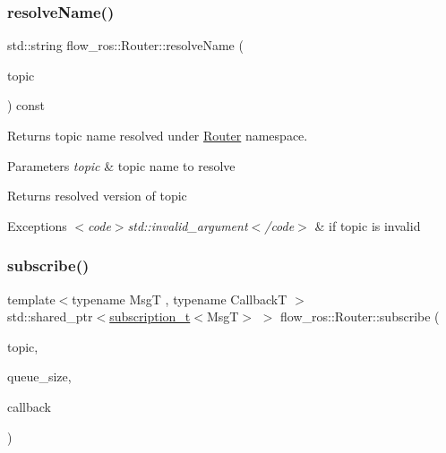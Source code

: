 \subsubsection{\texorpdfstring{resolve\+Name()}{resolveName()}}
{\footnotesize\ttfamily std\+::string flow\+\_\+ros\+::\+Router\+::resolve\+Name (\begin{DoxyParamCaption}\item[{const std\+::string \&}]{topic }\end{DoxyParamCaption}) const}



Returns topic name resolved under \hyperlink{classflow__ros_1_1_router}{Router} namespace. 


\begin{DoxyParams}{Parameters}
{\em topic} & topic name to resolve\\
\hline
\end{DoxyParams}
\begin{DoxyReturn}{Returns}
resolved version of {\ttfamily topic} 
\end{DoxyReturn}

\begin{DoxyExceptions}{Exceptions}
{\em $<$code$>$std\+::invalid\+\_\+argument$<$/code$>$} & if {\ttfamily topic} is invalid \\
\hline
\end{DoxyExceptions}
\mbox{\label{classflow__ros_1_1_router_a6f8d999bfe280549f4a3216205007450}} 
\subsubsection{\texorpdfstring{subscribe()}{subscribe()}\hspace{0.1cm}{\footnotesize\ttfamily [1/2]}}
{\footnotesize\ttfamily template$<$typename MsgT , typename CallbackT $>$ \\
std\+::shared\+\_\+ptr$<$\hyperlink{classflow__ros_1_1routing_1_1_local_subscription}{subscription\+\_\+t}$<$MsgT$>$ $>$ flow\+\_\+ros\+::\+Router\+::subscribe (\begin{DoxyParamCaption}\item[{const std\+::string \&}]{topic,  }\item[{const std\+::uint32\+\_\+t}]{queue\+\_\+size,  }\item[{CallbackT \&\&}]{callback }\end{DoxyParamCaption})\hspace{0.3cm}{\ttfamily [inline]}}



